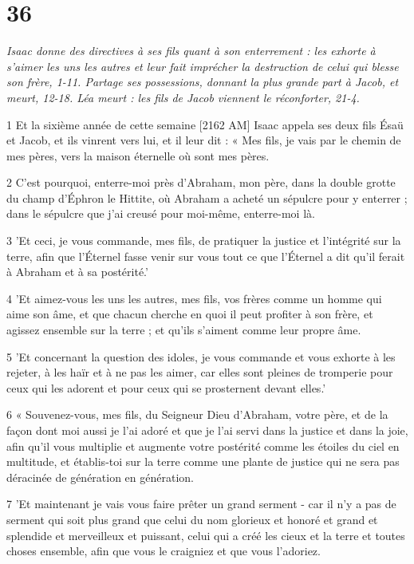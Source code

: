 \chapter{36}

\par \textit{Isaac donne des directives à ses fils quant à son enterrement : les exhorte à s'aimer les uns les autres et leur fait imprécher la destruction de celui qui blesse son frère, 1-11. Partage ses possessions, donnant la plus grande part à Jacob, et meurt, 12-18. Léa meurt : les fils de Jacob viennent le réconforter, 21-4.}

\par 1 Et la sixième année de cette semaine [2162 AM] Isaac appela ses deux fils Ésaü et Jacob, et ils vinrent vers lui, et il leur dit : « Mes fils, je vais par le chemin de mes pères, vers la maison éternelle où sont mes pères.
\par 2 C'est pourquoi, enterre-moi près d'Abraham, mon père, dans la double grotte du champ d'Éphron le Hittite, où Abraham a acheté un sépulcre pour y enterrer ; dans le sépulcre que j'ai creusé pour moi-même, enterre-moi là.
\par 3 'Et ceci, je vous commande, mes fils, de pratiquer la justice et l'intégrité sur la terre, afin que l'Éternel fasse venir sur vous tout ce que l'Éternel a dit qu'il ferait à Abraham et à sa postérité.'
\par 4 'Et aimez-vous les uns les autres, mes fils, vos frères comme un homme qui aime son âme, et que chacun cherche en quoi il peut profiter à son frère, et agissez ensemble sur la terre ; et qu'ils s'aiment comme leur propre âme.
\par 5 'Et concernant la question des idoles, je vous commande et vous exhorte à les rejeter, à les haïr et à ne pas les aimer, car elles sont pleines de tromperie pour ceux qui les adorent et pour ceux qui se prosternent devant elles.'
\par 6 « Souvenez-vous, mes fils, du Seigneur Dieu d'Abraham, votre père, et de la façon dont moi aussi je l'ai adoré et que je l'ai servi dans la justice et dans la joie, afin qu'il vous multiplie et augmente votre postérité comme les étoiles du ciel en multitude, et établis-toi sur la terre comme une plante de justice qui ne sera pas déracinée de génération en génération.
\par 7 'Et maintenant je vais vous faire prêter un grand serment - car il n'y a pas de serment qui soit plus grand que celui du nom glorieux et honoré et grand et splendide et merveilleux et puissant, celui qui a créé les cieux et la terre et toutes choses ensemble, afin que vous le craigniez et que vous l'adoriez.
